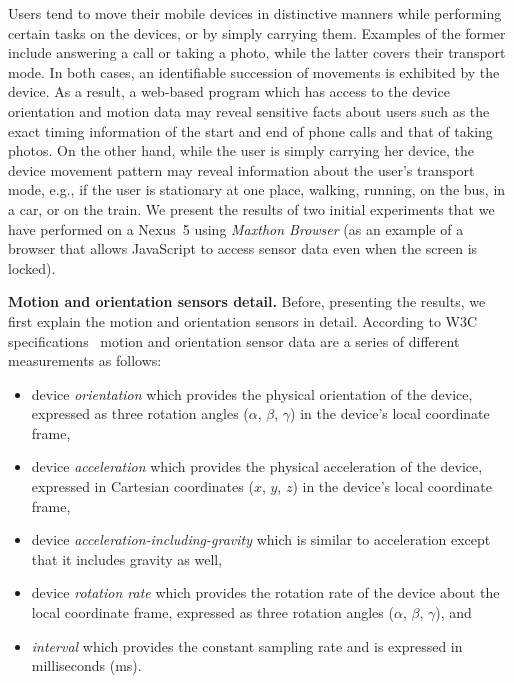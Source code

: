 \documentclass[10pt,twocolumn]{article}
\begin{document}
Users tend to move their mobile devices in distinctive manners while performing certain tasks on the devices, or by simply carrying them. 
Examples of the former include answering a call or taking a photo, while the latter covers their transport mode. 
In both cases, an identifiable succession of movements is exhibited by the device. 
As a result, a web-based program which has 
access to the device orientation and motion data 
may reveal sensitive facts about users such as the exact timing information of the start and end of phone calls and that of taking photos. 
On the other hand, while the user is simply carrying her device, the device movement pattern may reveal information about the user's transport mode, e.g., if the user is stationary at one place, walking, running, on the bus, in a car, or on the train. 
We present the results of two initial experiments that we have performed on a Nexus~5 using \textit{Maxthon Browser} (as an example of a browser that allows JavaScript to access sensor data even when the screen is locked). 


\textbf{Motion and orientation sensors detail.} Before, presenting the results, we first explain the motion and orientation sensors in detail. According to W3C specifications~\cite{W3CMotion} motion and orientation sensor data are a series of different measurements as follows:
\begin{itemize}
\item device \emph{orientation} which provides the physical orientation of the device, expressed as three rotation angles ($\alpha$, $\beta$, $\gamma$) in the device's local coordinate frame,

\item device \emph{acceleration} which provides the physical acceleration of the device, expressed in Cartesian coordinates ($x$, $y$, $z$) in the device's local coordinate frame,

\item device \emph{acceleration-including-gravity} which is similar to acceleration except that it includes gravity as well,

\item device \emph{rotation rate} which provides the rotation rate of the device about the local coordinate frame, expressed as three rotation angles ($\alpha$, $\beta$, $\gamma$), and

\item \emph{interval} which provides the constant sampling rate 
and is expressed in milliseconds (ms).
\end{itemize}
\end{document}
